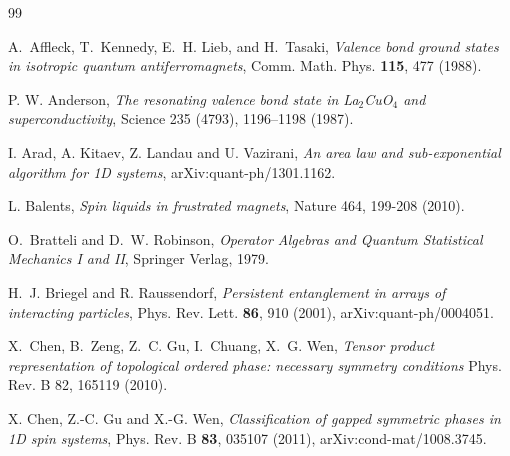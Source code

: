 \documentclass[cmp]{svjour}
\begin{document}
\providecommand{\bysame}{\leavevmode\hbox
    to3em{\hrulefill}\thinspace} \providecommand{\andname}{and }
\begin{thebibliography}{99}


    A.~Affleck, T.~Kennedy, E.~H. Lieb, and H.~Tasaki, \emph{Valence bond ground states in isotropic quantum antiferromagnets},
    \newblock Comm. Math. Phys. {\bf 115}, 477 (1988).

     P. W. Anderson,
    \newblock \emph{The resonating valence bond state in La$_2$CuO$_4$ and superconductivity}, Science 235 (4793), 1196–1198 (1987).


    I. Arad, A. Kitaev, Z. Landau and U. Vazirani, \emph{An area law and sub-exponential algorithm for 1D systems},
    \newblock arXiv:quant-ph/1301.1162.

    L. Balents, \emph{Spin liquids in frustrated magnets},
    \newblock Nature 464, 199-208 (2010).


     O.~Bratteli and D.~W. Robinson,
    \newblock \emph{Operator Algebras and Quantum Statistical Mechanics I and II},
    Springer Verlag, 1979.



    H.~J. Briegel and R. Raussendorf, \emph{Persistent entanglement in arrays of interacting particles},
    \newblock Phys. Rev. Lett. {\bf 86}, 910 (2001), arXiv:quant-ph/0004051.




    X.~Chen, B.~Zeng, Z.~C. Gu, I.~Chuang, X.~G. Wen,
    \newblock \emph{Tensor product representation of topological ordered phase: necessary symmetry conditions}
    \newblock Phys. Rev. B 82, 165119 (2010).

    X. Chen, Z.-C. Gu and X.-G. Wen,
    \emph{Classification of gapped symmetric phases in 1D spin systems},
    \newblock Phys. Rev. B {\bf 83}, 035107 (2011), arXiv:cond-mat/1008.3745.





\end{thebibliography}
\end{document}

